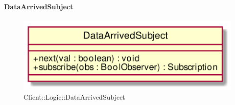 \hypertarget{DataArrivedSubject_label}{\paragraph{DataArrivedSubject}}
\begin{figure}[h]
	\centering
	\includegraphics[width=\textwidth,height=\textheight,keepaspectratio]{images/ClassDataArrivedSubject.png}
	\caption{Client::Logic::DataArrivedSubject}
\end{figure}
